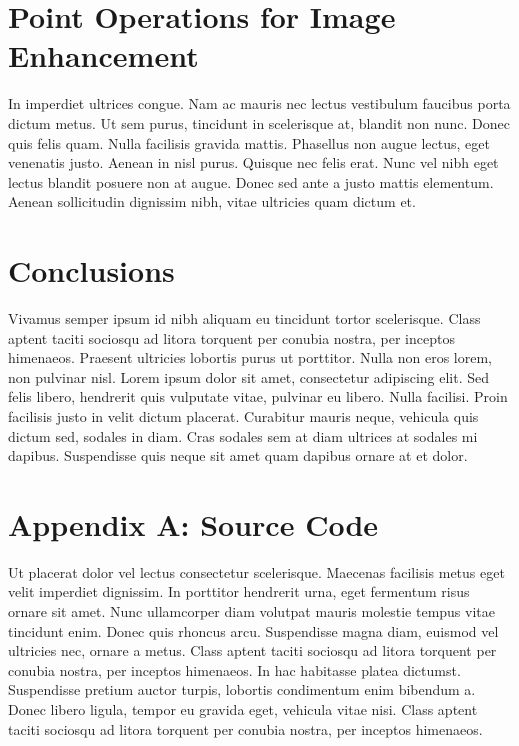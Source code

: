 \documentclass{sydeStyle}
\begin{document}


\section*{Point Operations for Image Enhancement}
In imperdiet ultrices congue. Nam ac mauris nec lectus vestibulum faucibus
porta dictum metus. Ut sem purus, tincidunt in scelerisque at, blandit non
nunc. Donec quis felis quam. Nulla facilisis gravida mattis. Phasellus non
augue lectus, eget venenatis justo. Aenean in nisl purus. Quisque nec felis
erat. Nunc vel nibh eget lectus blandit posuere non at augue. Donec sed
ante a justo mattis elementum. Aenean sollicitudin dignissim nibh, vitae
ultricies quam dictum et.

\section*{Conclusions}
Vivamus semper ipsum id nibh aliquam eu tincidunt tortor scelerisque. Class
aptent taciti sociosqu ad litora torquent per conubia nostra, per inceptos
himenaeos. Praesent ultricies lobortis purus ut porttitor. Nulla non eros
lorem, non pulvinar nisl. Lorem ipsum dolor sit amet, consectetur
adipiscing elit. Sed felis libero, hendrerit quis vulputate vitae, pulvinar
eu libero. Nulla facilisi. Proin facilisis justo in velit dictum placerat.
Curabitur mauris neque, vehicula quis dictum sed, sodales in diam. Cras
sodales sem at diam ultrices at sodales mi dapibus. Suspendisse quis neque
sit amet quam dapibus ornare at et dolor.

\section*{Appendix A: Source Code}
Ut placerat dolor vel lectus consectetur scelerisque. Maecenas facilisis
metus eget velit imperdiet dignissim. In porttitor hendrerit urna, eget
fermentum risus ornare sit amet. Nunc ullamcorper diam volutpat mauris
molestie tempus vitae tincidunt enim. Donec quis rhoncus arcu. Suspendisse
magna diam, euismod vel ultricies nec, ornare a metus. Class aptent taciti
sociosqu ad litora torquent per conubia nostra, per inceptos himenaeos. In
hac habitasse platea dictumst. Suspendisse pretium auctor turpis, lobortis
condimentum enim bibendum a. Donec libero ligula, tempor eu gravida eget,
vehicula vitae nisi. Class aptent taciti sociosqu ad litora torquent per
conubia nostra, per inceptos himenaeos.
\end{document}
